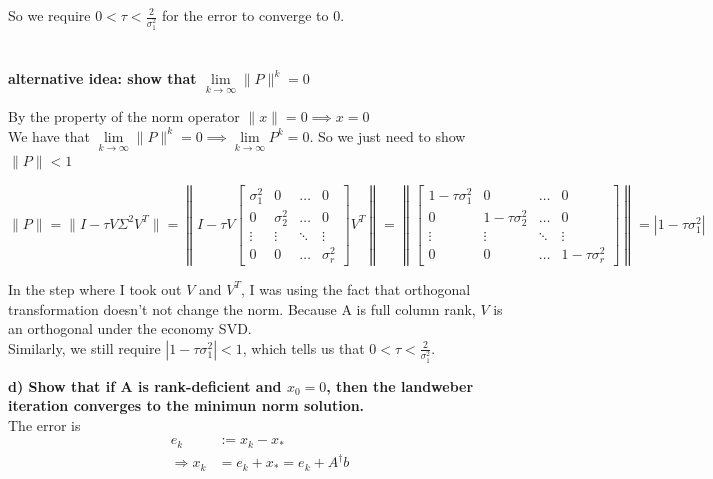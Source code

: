 \documentclass[paper=a4, fontsize=11pt]{scrartcl} %
\newcommand{\norm}[1]{\left\lVert#1\right\rVert}
\numberwithin{equation}{section} %
\numberwithin{figure}{section} %
\numberwithin{table}{section} %
\begin{document}
So we require $0 < \tau  < \frac{2}{\sigma_{1}^2}$ for the error to converge to 0. \\\\\\




\textbf{alternative idea: show that $  \underset{k \to \infty}{\lim} \|P\|^k = 0 $}

By the property of the norm operator $\|x\| = 0 \implies x = 0 $\\
We have that $\underset{k \to \infty}{\lim} \|P\|^k = 0 \implies \underset{k \to \infty}{\lim} P^k = 0$. So we just need to show $\|P\| < 1$  

$$
\|P\| = \| I - \tau V \Sigma^2 V^T \| 
= 
\norm{  
I - \tau V
\begin{bmatrix}
    \sigma_{1}^2 & 0 & \dots  & 0 \\
    0 & \sigma_{2}^2 & \dots  & 0 \\
	\vdots & \vdots & \ddots & \vdots \\
	0 & 0 & \dots  & \sigma_{r}^2
\end{bmatrix} 
V^T }
=
\norm{  
\begin{bmatrix}
    1- \tau \sigma_{1}^2 & 0 & \dots  & 0 \\
    0 & 1 - \tau \sigma_{2}^2 & \dots  & 0 \\
	\vdots & \vdots & \ddots & \vdots \\
	0 & 0 & \dots  & 1 - \tau \sigma_{r}^2
\end{bmatrix}}
=  |1- \tau \sigma_{1}^2|
$$

In the step where I took out $V$ and $V^T$, I was using the fact that orthogonal transformation doesn't not change the norm. Because A is full column rank, $V$ is an orthogonal under the economy SVD. \\

Similarly, we still require $|1- \tau \sigma_{1}^2| < 1$, which tells us that $0 < \tau  < \frac{2}{\sigma_{1}^2}$. 




\newpage
\textbf{d) Show that if A is rank-deficient and $x_0 = 0$, then the landweber iteration converges to the minimun norm solution. }\\ 

The error is
\begin{align*}
e_k &:= x_k - x_* 		\\
\Rightarrow  x_k &= e_k + x_* = e_k + A^\dagger b
\end{align*}
\end{document}
